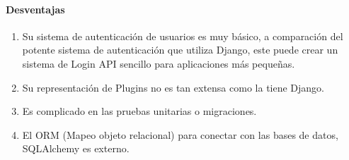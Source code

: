 \paragraph*{Desventajas}

\begin{enumerate}
    \item  Su sistema de autenticación de usuarios es muy básico, a comparación del potente sistema de autenticación que utiliza Django, este puede crear un sistema de Login API sencillo para aplicaciones más pequeñas.
    \item  Su representación de Plugins no es tan extensa como la tiene Django.
    \item  Es complicado en las pruebas unitarias o migraciones.
    \item El ORM (Mapeo objeto relacional) para conectar con las bases de datos, SQLAlchemy es externo.
\end{enumerate}